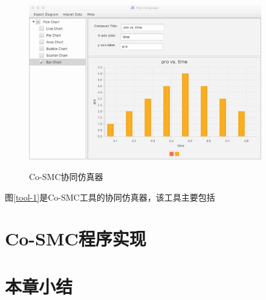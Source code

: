\begin{figure}[htbp]
	\centering
	{\includegraphics[width=4.0in]{fig/5/tool3.png}}
	\caption{Co-SMC协同仿真器}\label{tool-3}
\end{figure}
图\ref{tool-1}是Co-SMC工具的协同仿真器，该工具主要包括
\section{Co-SMC程序实现}


\section{本章小结}
